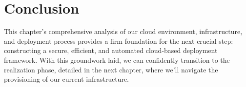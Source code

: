 \section*{Conclusion}
This chapter's comprehensive analysis of our cloud environment, infrastructure, and deployment process provides a firm foundation for the next crucial step: constructing a secure, efficient, and automated cloud-based deployment framework. With this groundwork laid, we can confidently transition to the realization phase, detailed in the next chapter, where we'll navigate the provisioning of our current infrastructure.
